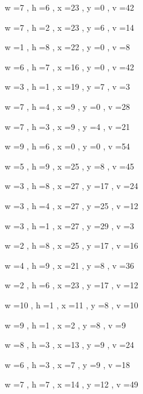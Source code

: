 \documentclass[11pt]{article}
\begin{document}
w =7 , h =6 , x =23 , y =0 , v =42
\par
w =7 , h =2 , x =23 , y =6 , v =14
\par
w =1 , h =8 , x =22 , y =0 , v =8
\par
w =6 , h =7 , x =16 , y =0 , v =42
\par
w =3 , h =1 , x =19 , y =7 , v =3
\par
w =7 , h =4 , x =9 , y =0 , v =28
\par
w =7 , h =3 , x =9 , y =4 , v =21
\par
w =9 , h =6 , x =0 , y =0 , v =54
\par
w =5 , h =9 , x =25 , y =8 , v =45
\par
w =3 , h =8 , x =27 , y =17 , v =24
\par
w =3 , h =4 , x =27 , y =25 , v =12
\par
w =3 , h =1 , x =27 , y =29 , v =3
\par
w =2 , h =8 , x =25 , y =17 , v =16
\par
w =4 , h =9 , x =21 , y =8 , v =36
\par
w =2 , h =6 , x =23 , y =17 , v =12
\par
w =10 , h =1 , x =11 , y =8 , v =10
\par
w =9 , h =1 , x =2 , y =8 , v =9
\par
w =8 , h =3 , x =13 , y =9 , v =24
\par
w =6 , h =3 , x =7 , y =9 , v =18
\par
w =7 , h =7 , x =14 , y =12 , v =49
\par
\newpage
\end{document}
